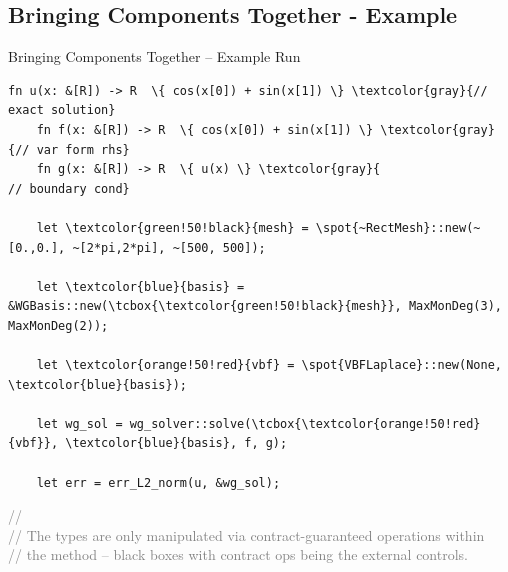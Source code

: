 \documentclass[compress]{beamer}
\begin{document}
\subsection{Bringing Components Together - Example}

\begin{frame}[fragile]{Bringing Components Together -- Example Run}
  \begin{Verbatim}[gobble=4, commandchars=\\\{\}, fontsize=\small, fontfamily=tt]
    fn u(x: &[R]) -> R  \{ cos(x[0]) + sin(x[1]) \} \textcolor{gray}{// exact solution}
    fn f(x: &[R]) -> R  \{ cos(x[0]) + sin(x[1]) \} \textcolor{gray}{// var form rhs}
    fn g(x: &[R]) -> R  \{ u(x) \} \textcolor{gray}{                 // boundary cond}

    let \textcolor{green!50!black}{mesh} = \spot{~RectMesh}::new(~[0.,0.], ~[2*pi,2*pi], ~[500, 500]);

    let \textcolor{blue}{basis} = &WGBasis::new(\tcbox{\textcolor{green!50!black}{mesh}}, MaxMonDeg(3), MaxMonDeg(2));

    let \textcolor{orange!50!red}{vbf} = \spot{VBFLaplace}::new(None, \textcolor{blue}{basis});

    let wg_sol = wg_solver::solve(\tcbox{\textcolor{orange!50!red}{vbf}}, \textcolor{blue}{basis}, f, g);

    let err = err_L2_norm(u, &wg_sol);
  \end{Verbatim}
  \footnotesize {
    \textcolor{gray}{// }\\
    \textcolor{gray}{// The types are only manipulated via contract-guaranteed operations within\\
      // the method -- black boxes with contract ops being the external controls.}
  }
\end{frame}
\end{document}
